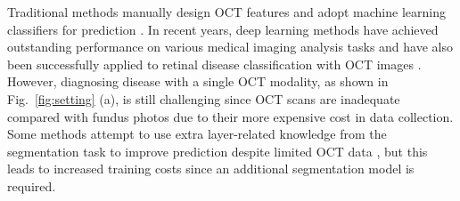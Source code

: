 \documentclass[runningheads]{llncs}
\newcommand{\xmli}[1]{{\color{red}{[XM: #1]}}}
\begin{document}
Traditional methods manually design OCT features and adopt machine learning classifiers for prediction \cite{liu2011automated,srinivasan2014fully,lemaitre2016classification}. 
In recent years, deep learning methods have achieved outstanding performance on various medical imaging analysis tasks and have also been successfully applied to retinal disease classification with OCT images \cite{lee2017deep,karri2017transfer,kermany2018identifying}.
However, diagnosing disease with a single OCT modality, as shown in Fig.~\ref{fig:setting} (a), is still challenging since OCT scans are inadequate compared with fundus photos due to their more expensive cost in data collection.
Some methods attempt to use extra layer-related knowledge from the segmentation task to improve prediction despite limited OCT data \cite{li2019deep,huang2019automatic,fang2019attention,liu2021one}, but this leads to increased training costs since an additional segmentation model is required. 

\end{document}
